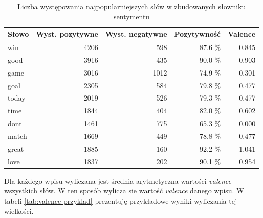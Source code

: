 \begin{table}[ht!]  
\begin{center}  
\begin{tabular}{|l|r|r|r|r|}
\hline
Słowo & Wyst. pozytywne  & Wyst. negatywne 
& Pozytywność
& Valence
\\ \hline 
win & 4206 & 598 & 87.6 \% & 0.845 \\ \hline
good & 3916 & 435 & 90.0 \% & 0.903 \\ \hline
game & 3016 & 1012 & 74.9 \% & 0.301 \\ \hline
goal & 2305 & 584 & 79.8 \% & 0.477 \\ \hline
today & 2019 & 526 & 79.3 \% & 0.477 \\ \hline
time & 1844 & 404 & 82.0 \% & 0.602 \\ \hline
dont & 1461 & 775 & 65.3 \% & 0.000 \\ \hline
match & 1669 & 449 & 78.8 \% & 0.477 \\ \hline
great & 1885 & 160 & 92.2 \% & 1.041 \\ \hline
love & 1837 & 202 & 90.1 \% & 0.954 \\ \hline
\end{tabular} 
\end{center} 
\caption{Liczba występowania najpopularniejszych słów w zbudowanych słowniku
sentymentu}
\label{tab:liczebnosc-slow-sentymentu}
\end{table}

Dla każdego wpisu wyliczana jest średnia arytmetyczna wartości \textit{valence}
wszystkich słów. W ten sposób wylicza sie wartość \textit{valence} danego wpisu.
W tabeli \ref{tab:valence-przyklad} prezentuję przykładowe wyniki wyliczania tej
wielkości.

